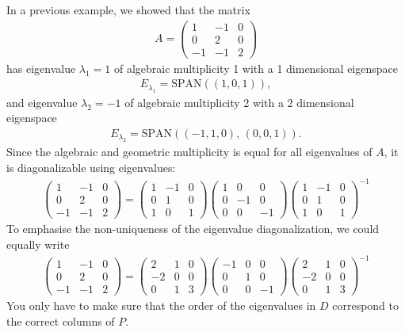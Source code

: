 \noindent In a previous example, we showed that the matrix
\begin{align*}
A =
\begin{pmatrix}
  1 & -1 &  0 \\
  0 &  2 &  0 \\
 -1 & -1 &  2
\end{pmatrix}
\end{align*}
has eigenvalue $\lambda_1=1$ of algebraic multiplicity 1 with a 1 dimensional eigenspace
\begin{align*}
E_{\lambda_1} = \text{SPAN}((1,0,1)),
\end{align*}
and eigenvalue $\lambda_2=-1$ of algebraic multiplicity 2 with a 2 dimensional eigenspace
\begin{align*}
E_{\lambda_2} = \text{SPAN}((-1,1,0), \, (0,0,1)).
\end{align*}
Since the algebraic and geometric multiplicity is equal for all eigenvalues of $A$, it is diagonalizable using eigenvalues:
\begin{align*}
\begin{pmatrix}
  1 & -1 &  0 \\
  0 &  2 &  0 \\
 -1 & -1 &  2
\end{pmatrix}
=
\begin{pmatrix}
  1 & -1 &  0 \\
  0 &  1 &  0 \\
  1 &  0 &  1
\end{pmatrix}
\begin{pmatrix}
  1 &  0 &  0 \\
  0 & -1 &  0 \\
  0 &  0 & -1
\end{pmatrix}
\begin{pmatrix}
  1 & -1 &  0 \\
  0 &  1 &  0 \\
  1 &  0 &  1
\end{pmatrix}^{-1}
\end{align*} 
To emphasise the non-uniqueness of the eigenvalue diagonalization, we could equally write
\begin{align*}
\begin{pmatrix}
  1 & -1 &  0 \\
  0 &  2 &  0 \\
 -1 & -1 &  2
\end{pmatrix}
=
\begin{pmatrix}
  2 &  1 &  0 \\
 -2 &  0 &  0 \\
  0 &  1 &  3
\end{pmatrix}
\begin{pmatrix}
 -1 &  0 &  0 \\
  0 &  1 &  0 \\
  0 &  0 & -1
\end{pmatrix}
\begin{pmatrix}
  2 &  1 &  0 \\
 -2 &  0 &  0 \\
  0 &  1 &  3
\end{pmatrix}^{-1}
\end{align*}
You only have to make sure that the order of the eigenvalues in $D$ correspond to the correct columns of $P$.

